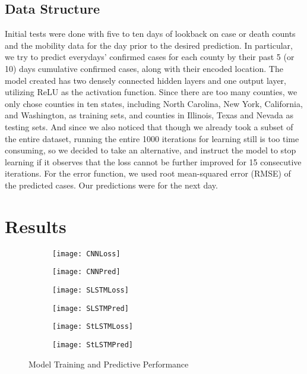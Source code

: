 ﻿\documentclass{article}
\begin{document}
\begin{multicols}{2}
\subsection*{Data Structure}

Initial tests were done with five to ten days of lookback on case or death
counts and the mobility data for the day prior to the desired prediction. In
particular, we try to predict everydays’ confirmed cases for each county by
their past 5 (or 10) days cumulative confirmed cases, along with their encoded
location. The model created has two densely connected hidden layers and one
output layer, utilizing ReLU as the activation function. Since there are too
many counties, we only chose counties in ten states, including North Carolina,
New York, California, and Washington, as training sets, and counties in
Illinois, Texas and Nevada as testing sets. And since we also noticed that
though we already took a subset of the entire dataset, running the entire 1000
iterations for learning still is too time consuming, so we decided to take an
alternative, and instruct the model to stop learning if it observes that the
loss cannot be further improved for 15 consecutive iterations. For the error
function, we used root mean-squared error (RMSE) of the predicted cases. Our
predictions were for the next day.

\end{multicols}

\section*{Results}

  \begin{figure}[!htb]
    \begin{subfigure}{.5\textwidth}
      \centering
      \texttt{[image: CNNLoss]}
      \label{fig:sfig1}
    \end{subfigure}
    \begin{subfigure}{.5\textwidth}
      \centering
      \texttt{[image: CNNPred]}
      \label{fig:sfig2}
    \end{subfigure}
    \begin{subfigure}{.5\textwidth}
      \centering
      \texttt{[image: SLSTMLoss]}
      \label{fig:sfig3}
    \end{subfigure}
    \begin{subfigure}{.5\textwidth}
      \centering
      \texttt{[image: SLSTMPred]}
      \label{fig:sfig4}
    \end{subfigure}
    \begin{subfigure}{.5\textwidth}
      \centering
      \texttt{[image: StLSTMLoss]}
      \label{fig:sfig5}
    \end{subfigure}
    \begin{subfigure}{.5\textwidth}
      \centering
      \texttt{[image: StLSTMPred]}
      \label{fig:sfig6}
    \end{subfigure}
    \caption{Model Training and Predictive Performance}
    \label{fig:fig1}
  \end{figure}
\end{document}

